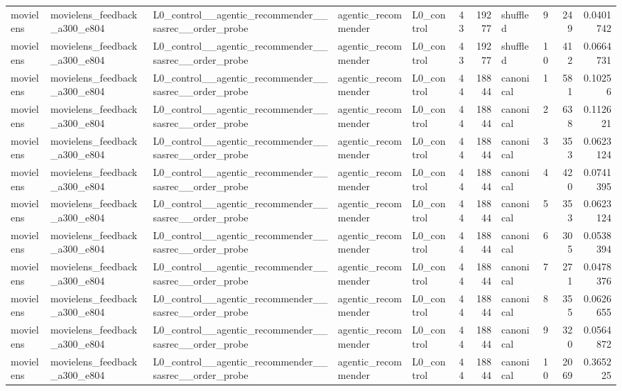 \begin{table}[htbp!]
\begin{tabular}{lllllrrlrrr}
movielens & movielens\_feedback\_a300\_e804 & L0\_control\_\_agentic\_recommender\_\_sasrec\_\_order\_probe & agentic\_recommender & L0\_control & 43 & 19277 & shuffled & 9 & 249 & 0.0401742 \\
movielens & movielens\_feedback\_a300\_e804 & L0\_control\_\_agentic\_recommender\_\_sasrec\_\_order\_probe & agentic\_recommender & L0\_control & 43 & 19277 & shuffled & 10 & 412 & 0.0664731 \\
movielens & movielens\_feedback\_a300\_e804 & L0\_control\_\_agentic\_recommender\_\_sasrec\_\_order\_probe & agentic\_recommender & L0\_control & 44 & 18844 & canonical & 1 & 581 & 0.10256 \\
movielens & movielens\_feedback\_a300\_e804 & L0\_control\_\_agentic\_recommender\_\_sasrec\_\_order\_probe & agentic\_recommender & L0\_control & 44 & 18844 & canonical & 2 & 638 & 0.112621 \\
movielens & movielens\_feedback\_a300\_e804 & L0\_control\_\_agentic\_recommender\_\_sasrec\_\_order\_probe & agentic\_recommender & L0\_control & 44 & 18844 & canonical & 3 & 353 & 0.0623124 \\
movielens & movielens\_feedback\_a300\_e804 & L0\_control\_\_agentic\_recommender\_\_sasrec\_\_order\_probe & agentic\_recommender & L0\_control & 44 & 18844 & canonical & 4 & 420 & 0.0741395 \\
movielens & movielens\_feedback\_a300\_e804 & L0\_control\_\_agentic\_recommender\_\_sasrec\_\_order\_probe & agentic\_recommender & L0\_control & 44 & 18844 & canonical & 5 & 353 & 0.0623124 \\
movielens & movielens\_feedback\_a300\_e804 & L0\_control\_\_agentic\_recommender\_\_sasrec\_\_order\_probe & agentic\_recommender & L0\_control & 44 & 18844 & canonical & 6 & 305 & 0.0538394 \\
movielens & movielens\_feedback\_a300\_e804 & L0\_control\_\_agentic\_recommender\_\_sasrec\_\_order\_probe & agentic\_recommender & L0\_control & 44 & 18844 & canonical & 7 & 271 & 0.0478376 \\
movielens & movielens\_feedback\_a300\_e804 & L0\_control\_\_agentic\_recommender\_\_sasrec\_\_order\_probe & agentic\_recommender & L0\_control & 44 & 18844 & canonical & 8 & 355 & 0.0626655 \\
movielens & movielens\_feedback\_a300\_e804 & L0\_control\_\_agentic\_recommender\_\_sasrec\_\_order\_probe & agentic\_recommender & L0\_control & 44 & 18844 & canonical & 9 & 320 & 0.0564872 \\
movielens & movielens\_feedback\_a300\_e804 & L0\_control\_\_agentic\_recommender\_\_sasrec\_\_order\_probe & agentic\_recommender & L0\_control & 44 & 18844 & canonical & 10 & 2069 & 0.365225 \\

\end{tabular}
\end{table}
